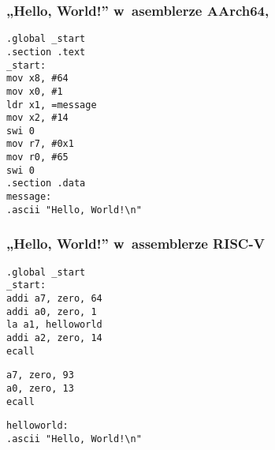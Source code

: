\documentclass[10pt,t]{beamer}
\begin{document}
\begin{frame}
  \frametitle{„Hello, World!” w~asemblerze AArch64,
    \parencite{Low-Level-Learning-You-Can-Learn-AArch64-ETC-Ver-2020}}


  \texttt{.global \_start} \\
  \texttt{.section .text} \\



  \texttt{\_start:} \\[-0.2em]
  \hphantom{aaaaaaaa} \texttt{mov x8, \#64} \\
  \hphantom{aaaaaaaa} \texttt{mov x0, \#1} \\
  \hphantom{aaaaaaaa} \texttt{ldr x1, =message} \\
  \hphantom{aaaaaaaa} \texttt{mov x2, \#14} \\

  \hphantom{aaaaaaaa} \texttt{swi 0} \\

  \hphantom{aaaaaaaa} \texttt{mov r7, \#0x1} \\
  \hphantom{aaaaaaaa} \texttt{mov r0, \#65} \\

  \hphantom{aaaaaaaa} \texttt{swi 0} \\



  \texttt{.section .data} \\
  \texttt{message:} \\
  \hphantom{aaaaaaaa} \texttt{.ascii "Hello, World!\textbackslash n"}

\end{frame}





\begin{frame}
  \frametitle{„Hello, World!” w~assemblerze RISC-V
    \parencite{Anonymous-Hello-World-in-x86-Assembly-Language}}


  \texttt{.global \_start} \\
  \texttt{\_start:} \\
  \hphantom{aaaa} \texttt{addi a7, zero, 64} \\
  \hphantom{aaaa} \texttt{addi a0, zero, 1} \\
  \hphantom{aaaa} \texttt{la a1, helloworld} \\
  \hphantom{aaaa} \texttt{addi a2, zero, 14} \\
  \hphantom{aaaa} \texttt{ecall}
  \vspace{0.8em}

  \hphantom{aaaa} \texttt{a7, zero, 93} \\
  \hphantom{aaaa} \texttt{a0, zero, 13} \\
  \hphantom{aaaa} \texttt{ecall}
  \vspace{0.8em}

  \texttt{helloworld:} \\
  \hphantom{aaaa} \texttt{.ascii "Hello, World!\textbackslash n"}

\end{frame}
\end{document}
